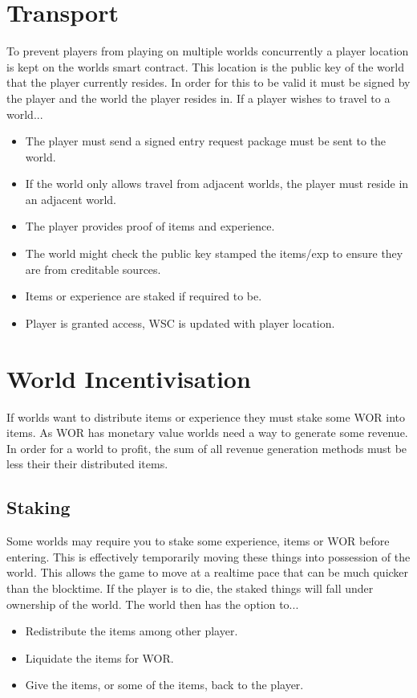\documentclass[runningheads,a4paper]{llncs}
\begin{document}
\section{Transport}
To prevent players from playing on multiple worlds concurrently a player location is kept on the worlds smart contract. This location is the public key of the world that the player currently resides. In order for this to be valid it must be signed by the player and the world the player resides in. If a player wishes to travel to a world... 

\begin{itemize}
\item{The player must send a signed entry request package must be sent to the world.}
\item{If the world only allows travel from adjacent worlds, the player must reside in an adjacent world.}
\item{The player provides proof of items and experience.}
\item{The world might check the public key stamped the items/exp to ensure they are from creditable sources.}
\item{Items or experience are staked if required to be.}
\item{Player is granted access, WSC is updated with player location.}
\end{itemize}

\section{World Incentivisation}
\label{MakeMoney}
If worlds want to distribute items or experience they must stake some WOR into items. As WOR has monetary value worlds need a way to generate some revenue. In order for a world to profit, the sum of all revenue generation methods must be less their their distributed items.

\subsection{Staking}
\label{Staking}
Some worlds may require you to stake some experience, items or WOR before entering. This is effectively temporarily moving these things into possession of the world. This allows the game to move at a realtime pace that can be much quicker than the blocktime. If the player is to die, the staked things will fall under ownership of the world. The world then has the option to...

\begin{itemize}
\item{Redistribute the items among other player.}
\item{Liquidate the items for WOR.}
\item{Give the items, or some of the items, back to the player.}
\end{itemize}
\end{document}
